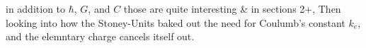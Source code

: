 \begin{multicols}{2}
 in addition to $\hbar$, $G$, and $C$ those are quite interesting \& in sections 2+, Then looking into how the Stoney-Units baked out the need for Coulumb's constant $k_e$, and the elemntary charge cancels itself out.






%
%

\end{multicols}
